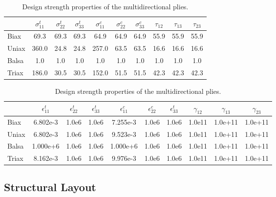 \begin{table}[h!]
\caption{Design strength properties of the multidirectional plies.}
\setlength\extrarowheight{2pt}
\centering
\begin{tabular}{lccccccccc}
\hline
\hline
	&$\sigma_{11}^t$ & $\sigma_{22}^t$  & $\sigma_{33}^t$  & $\sigma_{11}^c$  & $\sigma_{22}^c$  & $\sigma_{33}^c$  & $\tau_{12}$   & $\tau_{13}$   & $\tau_{23}$     \\
\hline
Biax	&	69.3         & 69.3  & 69.3  &  64.9 & 64.9  & 64.9  & 55.9 & 55.9 & 55.9 \\
Uniax	&	 360.0         & 24.8  & 24.8  & 257.0 & 63.5  & 63.5  & 16.6 & 16.6 & 16.6  \\
Balsa 	&	 1.0         &  1.0  &  1.0  &   1.0 &  1.0  &  1.0  &  1.0 &  1.0 &  1.0 \\
Triax 	&	186.0         & 30.5  & 30.5  & 152.0 & 51.5  & 51.5  & 42.3 & 42.3 & 42.3 \\
\hline
\hline
\end{tabular}
\label{tab:matprops_strength}
\end{table}


\begin{table}[h!]
\caption{Design strength properties of the multidirectional plies.}
\setlength\extrarowheight{2pt}
\centering
\begin{tabular}{lccccccccc}
\hline
\hline
	&$\epsilon_{11}^t$     & $\epsilon_{22}^t$ & $\epsilon_{33}^t$ & $\epsilon_{11}^c $   & $\epsilon_{22}^c$ & $\epsilon_{33}^t$ & $\gamma_{12}$    & $\gamma_{13} $    & $\gamma_{23}$     \\
\hline
Biax	&	 6.802e-3 & 1.0e6 & 1.0e6 & 7.255e-3 & 1.0e6 & 1.0e6 & 1.0e11 & 1.0e+11 & 1.0e+11 \\
Uniax	&	 6.802e-3 & 1.0e6 & 1.0e6 & 9.523e-3 & 1.0e6 & 1.0e6 & 1.0e11 & 1.0e+11 & 1.0e+11 \\
Balsa 	&	1.000e+6 & 1.0e6 & 1.0e6 & 1.000e+6 & 1.0e6 & 1.0e6 & 1.0e11 & 1.0e+11 & 1.0e+11 \\
Triax 	&	 8.162e-3 & 1.0e6 & 1.0e6 & 9.976e-3 & 1.0e6 & 1.0e6 & 1.0e11 & 1.0e+11 & 1.0e+11 \\
\hline
\hline
\end{tabular}
\label{tab:matprops_strength2}
\end{table}

\clearpage

\subsection{Structural Layout}
\label{sec:sizing}

